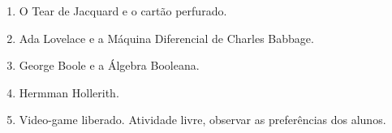 \begin{enumerate}
	\item O Tear de Jacquard e o cartão perfurado.
	\item Ada Lovelace e a Máquina Diferencial de Charles Babbage.
	\item George Boole e a Álgebra Booleana.
	\item Hermman Hollerith.
	\item Video-game liberado. Atividade livre, observar as preferências dos alunos.
\end{enumerate}
